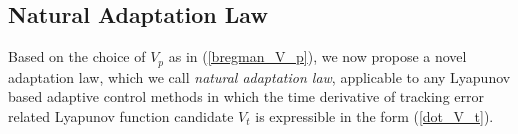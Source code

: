 \documentclass[letterpaper, 10 pt, conference]{ieeeconf}  %
\begin{document}
\subsection{Natural Adaptation Law}
Based on the choice of $V_{p}$ as in (\ref{bregman_V_p}), we now propose a novel adaptation law, which we call {\em natural adaptation law},  applicable to any Lyapunov based adaptive control methods in which the time derivative of tracking error related Lyapunov function candidate $V_{t}$ is expressible in the form (\ref{dot_V_t}).
\end{document}
